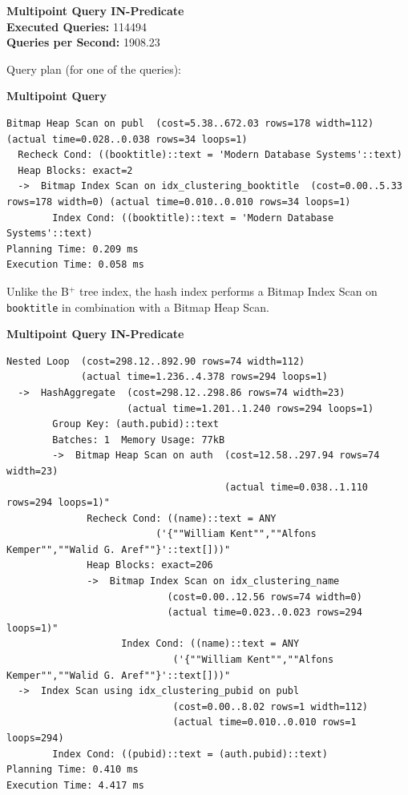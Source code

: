 \documentclass[11pt]{scrartcl}
\begin{document}
\textbf{Multipoint Query IN-Predicate}\\
\textbf{Executed Queries: } 114494\\
\textbf{Queries per Second: } 1908.23

Query plan (for one of the queries):

\textbf{Multipoint Query}
{\small
\parskip0pt\begin{verbatim}
Bitmap Heap Scan on publ  (cost=5.38..672.03 rows=178 width=112) (actual time=0.028..0.038 rows=34 loops=1)
  Recheck Cond: ((booktitle)::text = 'Modern Database Systems'::text)
  Heap Blocks: exact=2
  ->  Bitmap Index Scan on idx_clustering_booktitle  (cost=0.00..5.33 rows=178 width=0) (actual time=0.010..0.010 rows=34 loops=1)
        Index Cond: ((booktitle)::text = 'Modern Database Systems'::text)
Planning Time: 0.209 ms
Execution Time: 0.058 ms
\end{verbatim}}

Unlike the B$^+$ tree index, the hash index performs a Bitmap Index Scan on \texttt{booktitle} in combination with a Bitmap Heap Scan.

\textbf{Multipoint Query IN-Predicate}
{\small
\parskip0pt\begin{verbatim}
Nested Loop  (cost=298.12..892.90 rows=74 width=112)
             (actual time=1.236..4.378 rows=294 loops=1)
  ->  HashAggregate  (cost=298.12..298.86 rows=74 width=23)
                     (actual time=1.201..1.240 rows=294 loops=1)
        Group Key: (auth.pubid)::text
        Batches: 1  Memory Usage: 77kB
        ->  Bitmap Heap Scan on auth  (cost=12.58..297.94 rows=74 width=23)
                                      (actual time=0.038..1.110 rows=294 loops=1)"
              Recheck Cond: ((name)::text = ANY
                          ('{""William Kent"",""Alfons Kemper"",""Walid G. Aref""}'::text[]))"
              Heap Blocks: exact=206
              ->  Bitmap Index Scan on idx_clustering_name
                            (cost=0.00..12.56 rows=74 width=0)
                            (actual time=0.023..0.023 rows=294 loops=1)"
                    Index Cond: ((name)::text = ANY
                             ('{""William Kent"",""Alfons Kemper"",""Walid G. Aref""}'::text[]))"
  ->  Index Scan using idx_clustering_pubid on publ
                             (cost=0.00..8.02 rows=1 width=112)
                             (actual time=0.010..0.010 rows=1 loops=294)
        Index Cond: ((pubid)::text = (auth.pubid)::text)
Planning Time: 0.410 ms
Execution Time: 4.417 ms
\end{verbatim}}
\end{document}
